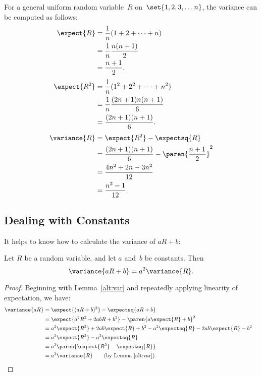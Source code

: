 For a general uniform random variable~$R$ on~$\set{1, 2, 3, \dots n}$,
the variance can be computed as follows:
\begin{align*}
\expect{R}
    &= \frac{1}{n} (1 + 2 + \dots + n) \\
    &= \frac{1}{n} \frac{n (n + 1)}{2} \\
    &= \frac{n + 1}{2}. \\[\jot]
%
\expect{R^2}
    &= \frac{1}{n} (1^2 + 2^2 + \dots + n^2) \\
    &= \frac{1}{n} \frac{(2n + 1) n (n + 1)}{6} \\
    &= \frac{(2n + 1) (n + 1)}{6}. \\[\jot]
%
\variance{R}
    &= \expect{R^2} - \expectsq{R} \\
    &= \frac{(2n + 1) (n + 1)}{6} - \paren{\frac{n + 1}{2}}^2 \\
    &= \frac{4n^2 + 2n - 3n^2}{12} \\
    &= \frac{n^2 - 1}{12}.
\end{align*}

\subsection{Dealing with Constants}

It helps to know how to calculate the variance of $a R + b$:

\begin{theorem}\label{var.const}\label{var+const}\label{thm:var(aR+b)}
Let $R$ be a random variable, and let $a$ and~$b$ be constants. Then
\begin{equation}\label{a2R}
    \variance{a R + b} = a^2 \variance{R}.
\end{equation}
\end{theorem}

\begin{proof}
Beginning with Lemma~\ref{alt:var} and repeatedly applying linearity
of expectation, we have:
\begin{align*}
\variance{aR}
    &= \expect{(a R + b)^2} - \expectsq{a R + b} \\
    &= \expect{a^2 R^2 + 2 a b R + b^2}
            - \paren{a \expect{R} + b}^2 \\
    &= a^2 \expect{R^2} + 2 a b \expect{R} + b^2
        - a^2 \expectsq{R} - 2 a b \expect{R} - b^2 \\
    & = a^2\expect{R^2} -a^2\expectsq{R}\\
    & = a^2\paren{\expect{R^2} - \expectsq{R}}\\
    & = a^2\variance{R} \qquad \text{(by Lemma~\ref{alt:var})}. & \qedhere
\end{align*}
\end{proof}

